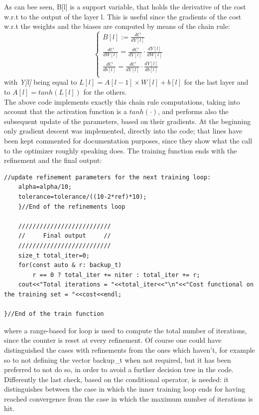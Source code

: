 \documentclass[12pt, a4paper]{report}
\theoremstyle{definition}
\begin{document}
\noindent As can bee seen, {\ttfamily B[l]} is a support variable, that holds the derivative of the cost w.r.t to the output of the layer {\ttfamily l}. This is useful since the gradients of the cost w.r.t the weights and the biases are computed by means of the chain rule:
\begin{equation*}
	\begin{cases}
	B[l] := \frac{dC}{dY[l]}\\ 
	\frac{dC}{dW[l]} = \frac{dC}{dY[l]} \cdot \frac{dY[l]}{dW[l]} \\
	\frac{dC}{db[l]} = \frac{dC}{dY[l]} \cdot \frac{dY[l]}{db[l]} \\
	\end{cases}
\end{equation*} 
with \textit{Y[l]} being equal to $L[l]=A[l-1]\times W[l]+b[l]$ for the last layer and to $A[l]=tanh(L[l])$ for the others.\\
The above code implements exactly this chain rule computations, taking into account that the activation function is a $tanh(\cdot)$, and performs also the subsequent update of the parameters, based on their gradients. At the beginning only gradient descent was implemented, directly into the code; that lines have been kept commented for documentation purposes, since they show what the call to the optimizer roughly speaking does.%
\newpage\noindent The training function ends with the refinement and the final output:
\begin{lstlisting}[frame=single, showstringspaces=false]
	//update refinement parameters for the next training loop:
	alpha=alpha/10;
	tolerance=tolerance/((10-2*ref)*10);
	}//End of the refinements loop

	//////////////////////////
	//     Final output     //
	//////////////////////////
	size_t total_iter=0;
	for(const auto & r: backup_t)
		r == 0 ? total_iter += niter : total_iter += r;
	cout<<"Total iterations = "<<total_iter<<"\n"<<"Cost functional on the training set = "<<cost<<endl;

}//End of the train function
\end{lstlisting}
where a range-based for loop is used to compute the total number of iterations, since the counter is reset at every refinement. Of course one could have distinguished the cases with refinements from the ones which haven't, for example so to not defining the vector {\ttfamily backup\_t} when not required, but it has been preferred to not do so, in order to avoid a further decision tree in the code. Differently the last check, based on the conditional operator, is needed: it distinguishes between the case in which the inner training loop ends for having reached convergence from the case in which the maximum number of iterations is hit.\\
\end{document}

